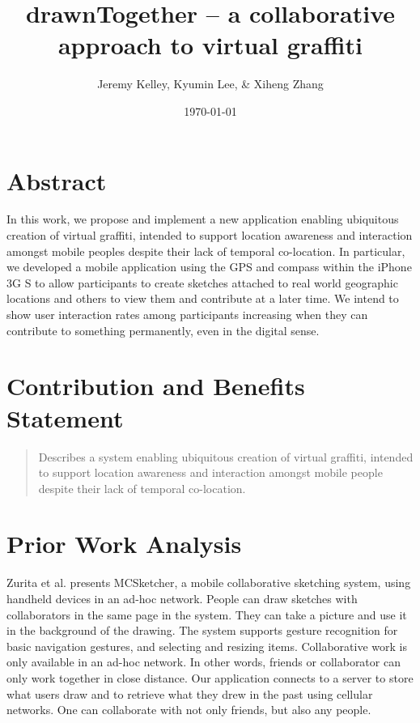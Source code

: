 \documentclass{www2010-submission}
\begin{document}
\setlength{\parindent}{0pt}
\setlength{\parskip}{.5ex plus 0.5ex minus 0.2ex}




\title{ drawnTogether -- a collaborative approach to virtual graffiti }

\author{ Jeremy Kelley, Kyumin Lee, \& Xiheng Zhang }

\date{\today}

\maketitle

\section{ Abstract }

In this work, we propose and implement a new application enabling ubiquitous
creation of virtual graffiti, intended to support location awareness and
interaction amongst mobile peoples despite their lack of temporal co-location.
In particular, we developed a mobile application using the GPS and compass
within the iPhone 3G S to allow participants to create sketches attached to
real world geographic locations and others to view them and contribute at a
later time.  We intend to show user interaction rates among participants
increasing when they can contribute to something permanently, even in the
digital sense.

\section{ Contribution and Benefits Statement }

\begin{quote}
Describes a system enabling ubiquitous creation of virtual graffiti, intended
to support location awareness and interaction amongst mobile people despite
their lack of temporal co-location.
\end{quote}

\section{ Prior Work Analysis }

Zurita et al. \cite{sketching:zurita} presents MCSketcher, a mobile
collaborative sketching system, using handheld devices in an ad-hoc network.
People can draw sketches with collaborators in the same page in the system.
They can take a picture and use it in the background of the drawing. The system
supports gesture recognition for basic navigation gestures, and selecting and
resizing items. Collaborative work is only available in an ad-hoc network. In
other words, friends or collaborator can only work together in close distance.
Our application connects to a server to store what users draw and to retrieve
what they drew in the past using cellular networks. One can collaborate with
not only friends, but also any people.
\end{document}
